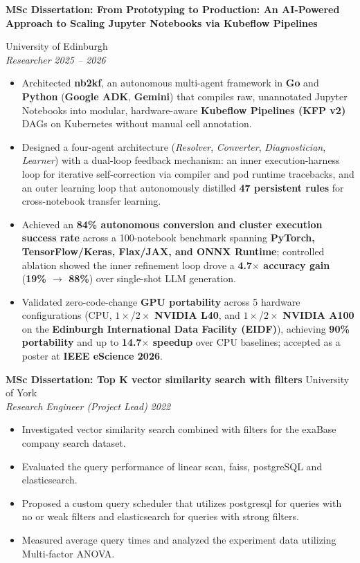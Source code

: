 \documentclass[10pt,a4paper]{article}
\newcommand{\entry}[4]{
  \textbf{#1} \hfill #2 \\
  \textit{#3} \hfill \textit{#4}
}
\begin{document}
\parbox[t]{0.74\textwidth}{\raggedright\textbf{MSc Dissertation: From Prototyping to Production: An AI-Powered Approach to Scaling Jupyter Notebooks via Kubeflow Pipelines}\strut} \hfill University of Edinburgh \\
\textit{Researcher} \hfill \textit{2025 -- 2026}
\begin{itemize}[noitemsep, leftmargin=*]
    \item Architected \textbf{nb2kf}, an autonomous multi-agent framework in \textbf{Go} and \textbf{Python} (\textbf{Google ADK}, \textbf{Gemini}) that compiles raw, unannotated Jupyter Notebooks into modular, hardware-aware \textbf{Kubeflow Pipelines (KFP v2)} DAGs on Kubernetes without manual cell annotation.
    \item Designed a four-agent architecture (\textit{Resolver}, \textit{Converter}, \textit{Diagnostician}, \textit{Learner}) with a dual-loop feedback mechanism: an inner execution-harness loop for iterative self-correction via compiler and pod runtime tracebacks, and an outer learning loop that autonomously distilled \textbf{47 persistent rules} for cross-notebook transfer learning.
    \item Achieved an \textbf{84\% autonomous conversion and cluster execution success rate} across a 100-notebook benchmark spanning \textbf{PyTorch, TensorFlow/Keras, Flax/JAX, and ONNX Runtime}; controlled ablation showed the inner refinement loop drove a \textbf{4.7$\times$ accuracy gain} (\textbf{19\% $\to$ 88\%}) over single-shot LLM generation.
    \item Validated zero-code-change \textbf{GPU portability} across 5 hardware configurations (CPU, $1\times$/$2\times$ \textbf{NVIDIA L40}, and $1\times$/$2\times$ \textbf{NVIDIA A100} on the \textbf{Edinburgh International Data Facility (EIDF)}), achieving \textbf{90\% portability} and up to \textbf{14.7$\times$ speedup} over CPU baselines; accepted as a poster at \textbf{IEEE eScience 2026}.
\end{itemize}
\vspace{3pt}

\entry{MSc Dissertation: Top K vector similarity search with filters}{University of York}{Research Engineer (Project Lead)}{2022}
\begin{itemize}[noitemsep, leftmargin=*]
    \item Investigated vector similarity search combined with filters for the exaBase company search dataset.
    \item Evaluated the query performance of linear scan, faiss, postgreSQL and elasticsearch.
    \item Proposed a custom query scheduler that utilizes postgresql for queries with no or weak filters and elasticsearch for queries with strong filters.
    \item Measured average query times and analyzed the experiment data utilizing Multi-factor ANOVA.
\end{itemize}
\vspace{3pt}
\end{document}
